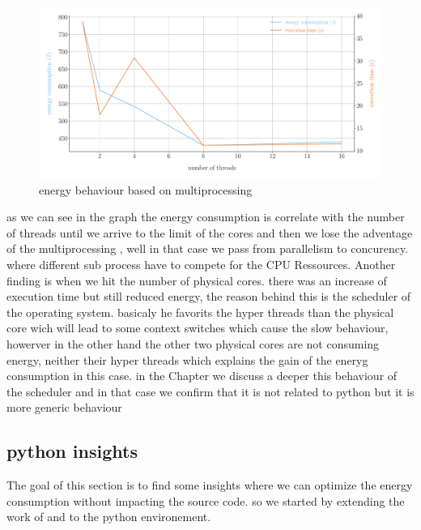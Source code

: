 \begin{figure}[hbt]
    \centering
    \includegraphics[width=\linewidth]{imgs/multiprocessing_energyvstime}
    \caption{energy behaviour based on multiprocessing}
    \label{fig:python_multiprocessing}
\end{figure}

as we can see in the graph the energy consumption is correlate with the number of threads until we arrive to the limit of the cores and then we lose the adventage of the multiprocessing , well in that case we pass from parallelism to concurency. where different sub process have to compete for the CPU Ressources.
Another finding is when we hit the number of physical cores. there was an increase of execution time but still reduced energy, the reason behind this is the scheduler of the operating system. basicaly he favorits the hyper threads than the physical core wich will lead to some context switches which cause the slow behaviour, howerver in the other hand the other two physical cores are not consuming energy, neither their hyper threads which explains the gain of the eneryg consumption in this case.
in the Chapter %
we discuss a deeper this behaviour of the scheduler and in that case we confirm that it is not related to python but it is more generic behaviour %


\subsection{python insights}

The goal of this section is to find some insights where we can optimize the energy consumption without impacting the source code. so we started by extending the work of \citeauthor{hasan_energy_2016} and \citeauthor{oliveira_recommending_nodate} to the python environement.



